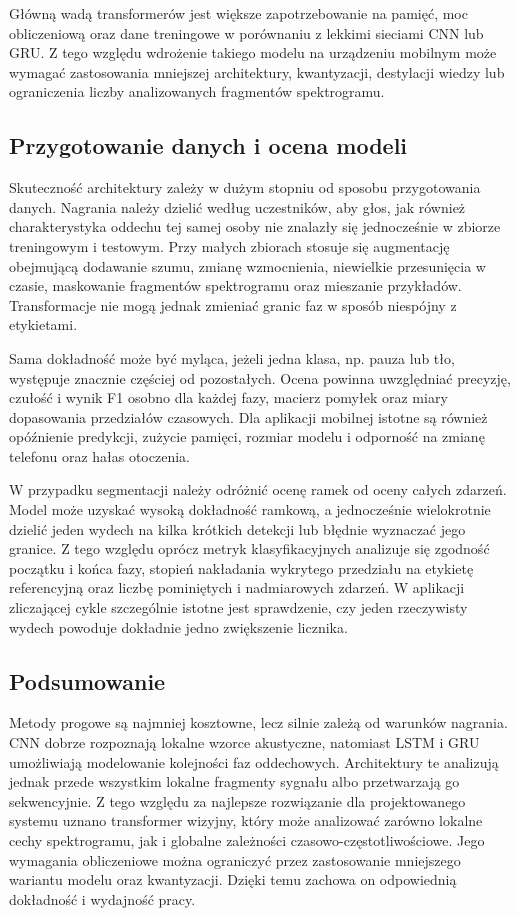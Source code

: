 Główną wadą transformerów jest większe zapotrzebowanie na pamięć, moc obliczeniową oraz dane treningowe w porównaniu z lekkimi sieciami CNN lub GRU. Z tego względu wdrożenie takiego modelu na urządzeniu mobilnym może wymagać zastosowania mniejszej architektury, kwantyzacji, destylacji wiedzy lub ograniczenia liczby analizowanych fragmentów spektrogramu.

\subsection{Przygotowanie danych i ocena modeli}

Skuteczność architektury zależy w dużym stopniu od sposobu przygotowania danych. Nagrania należy dzielić według uczestników, aby głos, jak również charakterystyka oddechu tej samej osoby nie znalazły się jednocześnie w zbiorze treningowym i testowym. Przy małych zbiorach stosuje się augmentację obejmującą dodawanie szumu, zmianę wzmocnienia, niewielkie przesunięcia w czasie, maskowanie fragmentów spektrogramu oraz mieszanie przykładów. Transformacje nie mogą jednak zmieniać granic faz w sposób niespójny z etykietami.

Sama dokładność może być myląca, jeżeli jedna klasa, np. pauza lub tło, występuje znacznie częściej od pozostałych. Ocena powinna uwzględniać precyzję, czułość i wynik F1 osobno dla każdej fazy, macierz pomyłek oraz miary dopasowania przedziałów czasowych. Dla aplikacji mobilnej istotne są również opóźnienie predykcji, zużycie pamięci, rozmiar modelu i odporność na zmianę telefonu oraz hałas otoczenia.

W przypadku segmentacji należy odróżnić ocenę ramek od oceny całych zdarzeń. Model może uzyskać wysoką dokładność ramkową, a jednocześnie wielokrotnie dzielić jeden wydech na kilka krótkich detekcji lub błędnie wyznaczać jego granice. Z tego względu oprócz metryk klasyfikacyjnych analizuje się zgodność początku i końca fazy, stopień nakładania wykrytego przedziału na etykietę referencyjną oraz liczbę pominiętych i nadmiarowych zdarzeń. W aplikacji zliczającej cykle szczególnie istotne jest sprawdzenie, czy jeden rzeczywisty wydech powoduje dokładnie jedno zwiększenie licznika.

\subsection{Podsumowanie}

Metody progowe są najmniej kosztowne, lecz silnie zależą od warunków nagrania. CNN dobrze rozpoznają lokalne wzorce akustyczne, natomiast LSTM i GRU umożliwiają modelowanie kolejności faz oddechowych. Architektury te analizują jednak przede wszystkim lokalne fragmenty sygnału albo przetwarzają go sekwencyjnie. Z tego względu za najlepsze rozwiązanie dla projektowanego systemu uznano transformer wizyjny, który może analizować zarówno lokalne cechy spektrogramu, jak i globalne zależności czasowo-częstotliwościowe. Jego wymagania obliczeniowe można ograniczyć przez zastosowanie mniejszego wariantu modelu oraz kwantyzacji. Dzięki temu zachowa on odpowiednią dokładność i wydajność pracy.